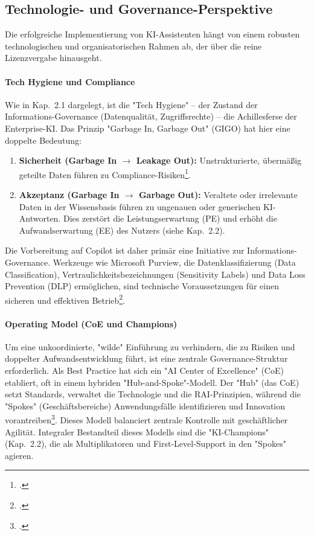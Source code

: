 \documentclass[12pt,a4paper,oneside]{article} %
\begin{document}
\subsection{Technologie- und Governance-Perspektive}
Die erfolgreiche Implementierung von KI-Assistenten hängt von einem robusten technologischen und organisatorischen Rahmen ab, der über die reine Lizenzvergabe hinausgeht.

\paragraph{Tech Hygiene und Compliance}
Wie in Kap.~2.1 dargelegt, ist die "Tech Hygiene" – der Zustand der Informations-Governance (Datenqualität, Zugriffsrechte) – die Achillesferse der Enterprise-KI. Das Prinzip "Garbage In, Garbage Out" (GIGO) hat hier eine doppelte Bedeutung:
\begin{enumerate}
    \item \textbf{Sicherheit (Garbage In $\rightarrow$ Leakage Out):} Unstrukturierte, übermäßig geteilte Daten führen zu Compliance-Risiken\footcite{MicrosoftLearn2025CopilotSecurity}.
    \item \textbf{Akzeptanz (Garbage In $\rightarrow$ Garbage Out):} Veraltete oder irrelevante Daten in der Wissensbasis führen zu ungenauen oder generischen KI-Antworten. Dies zerstört die Leistungserwartung (PE) und erhöht die Aufwandserwartung (EE) des Nutzers (siehe Kap.~2.2).
\end{enumerate}
Die Vorbereitung auf Copilot ist daher primär eine Initiative zur Informations-Governance. Werkzeuge wie Microsoft Purview, die Datenklassifizierung (Data Classification), Vertraulichkeitsbezeichnungen (Sensitivity Labels) und Data Loss Prevention (DLP) ermöglichen, sind technische Voraussetzungen für einen sicheren und effektiven Betrieb\footcite{MicrosoftLearn2025PurviewGenAI}.

\paragraph{Operating Model (CoE und Champions)}
Um eine unkoordinierte, "wilde" Einführung zu verhindern, die zu Risiken und doppelter Aufwandsentwicklung führt, ist eine zentrale Governance-Struktur erforderlich. Als Best Practice hat sich ein "AI Center of Excellence" (CoE) etabliert, oft in einem hybriden "Hub-and-Spoke"-Modell. Der "Hub" (das CoE) setzt Standards, verwaltet die Technologie und die RAI-Prinzipien, während die "Spokes" (Geschäftsbereiche) Anwendungsfälle identifizieren und Innovation vorantreiben\footcite{Dataiku2025CoEBestPractices}. Dieses Modell balanciert zentrale Kontrolle mit geschäftlicher Agilität. Integraler Bestandteil dieses Modells sind die "KI-Champions" (Kap.~2.2), die als Multiplikatoren und First-Level-Support in den "Spokes" agieren.
\end{document}
